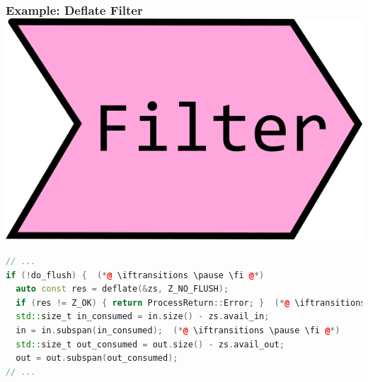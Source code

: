 \documentclass[aspectratio=169]{beamer}
\newif\iftransitions
\begin{document}
\begin{frame}[fragile]
  \frametitle{Example: Deflate Filter \hspace{233pt} \includegraphics[height=.1\textheight]{pipelinesgfx/filter.png}}
  
  \begin{lstlisting}[language={C++}]
// ...
if (!do_flush) {  (*@ \iftransitions \pause \fi @*)
  auto const res = deflate(&zs, Z_NO_FLUSH);
  if (res != Z_OK) { return ProcessReturn::Error; }  (*@ \iftransitions \pause \fi @*)
  std::size_t in_consumed = in.size() - zs.avail_in;
  in = in.subspan(in_consumed);  (*@ \iftransitions \pause \fi @*)
  std::size_t out_consumed = out.size() - zs.avail_out;
  out = out.subspan(out_consumed);
// ...
  \end{lstlisting}
\end{frame}
\end{document}
